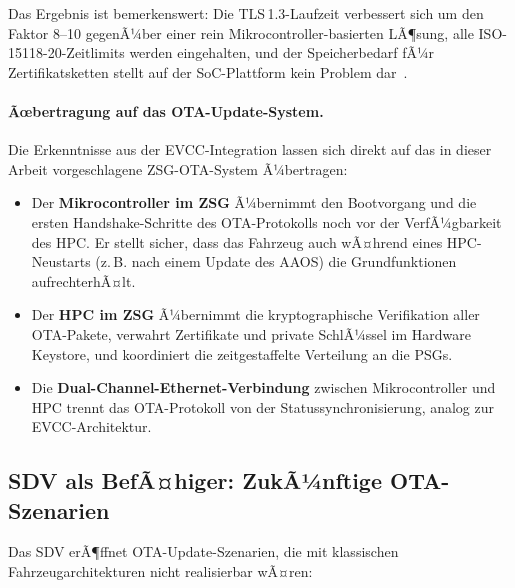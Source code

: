 ﻿\documentclass[12pt,a4paper,twoside]{article}
\begin{document}
Das Ergebnis ist bemerkenswert: Die TLS\,1.3-Laufzeit verbessert sich
um den Faktor 8--10 gegenÃ¼ber einer rein Mikrocontroller-basierten LÃ¶sung,
alle ISO-15118-20-Zeitlimits werden eingehalten, und der Speicherbedarf fÃ¼r
Zertifikatsketten stellt auf der SoC-Plattform kein Problem dar~\cite{schneider2026ladekomm}.

\paragraph{Ãœbertragung auf das OTA-Update-System.}
Die Erkenntnisse aus der EVCC-Integration lassen sich direkt auf das
in dieser Arbeit vorgeschlagene ZSG-OTA-System Ã¼bertragen:

\begin{itemize}
  \item Der \textbf{Mikrocontroller im ZSG} Ã¼bernimmt den Bootvorgang und
    die ersten Hand\-shake-Schritte des OTA-Protokolls noch vor der VerfÃ¼gbarkeit
    des HPC. Er stellt sicher, dass das Fahrzeug auch wÃ¤hrend eines HPC-Neustarts
    (z.\,B. nach einem Update des AAOS) die Grundfunktionen aufrechterhÃ¤lt.
  \item Der \textbf{HPC im ZSG} Ã¼bernimmt die kryptographische Verifikation
    aller OTA-Pakete, verwahrt Zertifikate und private SchlÃ¼ssel im Hardware
    Keystore, und koordiniert die zeitgestaffelte Verteilung an die PSGs.
  \item Die \textbf{Dual-Channel-Ethernet-Verbindung} zwischen Mikrocontroller
    und HPC trennt das OTA-Protokoll von der Statussynchronisierung, analog
    zur EVCC-Architek\-tur.
\end{itemize}

\subsection{SDV als BefÃ¤higer: ZukÃ¼nftige OTA-Szenarien}
\label{subsec:sdv_zukunft}

Das SDV erÃ¶ffnet OTA-Update-Szenarien, die mit klassischen Fahrzeugarchitekturen
nicht realisierbar wÃ¤ren:
\end{document}
